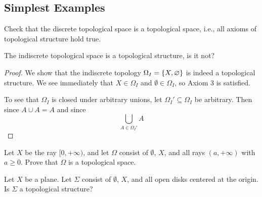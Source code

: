 \subsection{Simplest Examples}

\begin{majorEx}
    Check that the discrete topological space is a topological space, i.e., all
    axioms of topological structure hold true.
\end{majorEx}

\begin{majorEx}
    The indiscrete topological space is a topological structure, is it not?
\end{majorEx}

\begin{proof}
    We show that the indiscrete topology $\Omega_I = \{X, \varnothing\}$ is
    indeed a topological structure. We see immediately that $X \in \Omega_I$ and
    $\emptyset \in \Omega_I$, so Axiom 3 is satisfied.

    To see that $\Omega_I$ is closed under arbitrary unions, let $\Omega_I'
    \subseteq \Omega_I$ be arbitrary. Then since $A \cup A = A$ and since 
    \[
        \bigcup_{A \in \Omega_I'} A
    \]
\end{proof}

\begin{minorEx}
    Let $X$ be the ray $[0, +\infty)$, and let $\Omega$ consist of $\emptyset$, %
    $X$, and all rays $(a, +\infty)$ with $a \geq 0$. Prove that $\Omega$ is
    a topological space.
\end{minorEx}

\begin{minorEx}
    Let $X$ be a plane. Let $\Sigma$ consist of $\emptyset$, $X$, and all open
    disks centered at the origin. Is $\Sigma$ a topological structure?
\end{minorEx}

